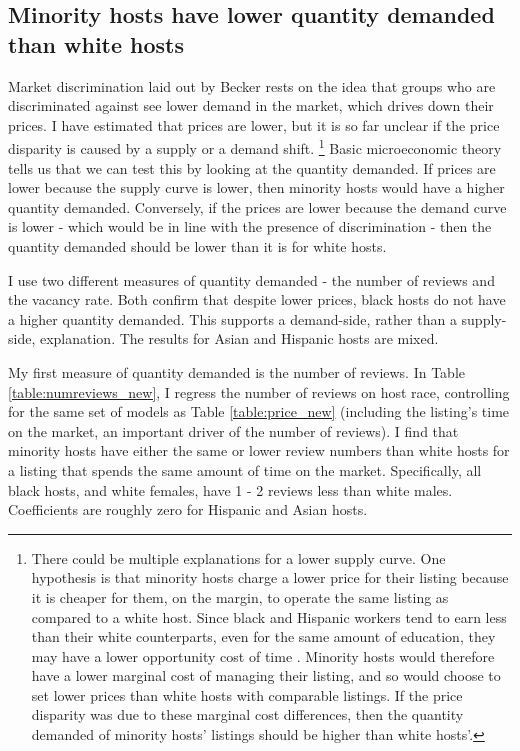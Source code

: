 \subsection{Minority hosts have lower quantity demanded than white hosts}
	\label{result2}
Market discrimination laid out by Becker rests on the idea that groups who are discriminated against see lower demand in the market, which drives down their prices. I have estimated that prices are lower, but it is so far unclear if the price disparity is caused by a supply or a demand shift.%
	\footnote{There could be multiple explanations for a lower supply curve. One hypothesis is that minority hosts charge a lower price for their listing because it is cheaper for them, on the margin, to operate the same listing as compared to a white host. Since black and Hispanic workers tend to earn less than their white counterparts, even for the same amount of education, they may have a lower opportunity cost of time \citep{wages}. Minority hosts would therefore have a lower marginal cost of managing their listing, and so would choose to set lower prices than white hosts with comparable listings. If the price disparity was due to these marginal cost differences, then the quantity demanded of minority hosts' listings should be higher than white hosts'.}
Basic microeconomic theory tells us that we can test this by looking at the quantity demanded. If prices are lower because the supply curve is lower, then minority hosts would have a higher quantity demanded. Conversely, if the prices are lower because the demand curve is lower - which would be in line with the presence of discrimination - then the quantity demanded should be lower than it is for white hosts. 
 
I use two different measures of quantity demanded - the number of reviews and the vacancy rate. Both confirm that despite lower prices, black hosts do not have a higher quantity demanded. This supports a demand-side, rather than a supply-side, explanation. The results for Asian and Hispanic hosts are mixed. 

My first measure of quantity demanded is the number of reviews. In Table \ref{table:numreviews_new}, I regress the number of reviews on host race, controlling for the same set of models as Table \ref{table:price_new} (including the listing's time on the market, an important driver of the number of reviews). I find that minority hosts have either the same or lower review numbers than white hosts for a listing that spends the same amount of time on the market. Specifically, all black hosts, and white females, have 1 - 2 reviews less than white males. Coefficients are roughly zero for Hispanic and Asian hosts. 

